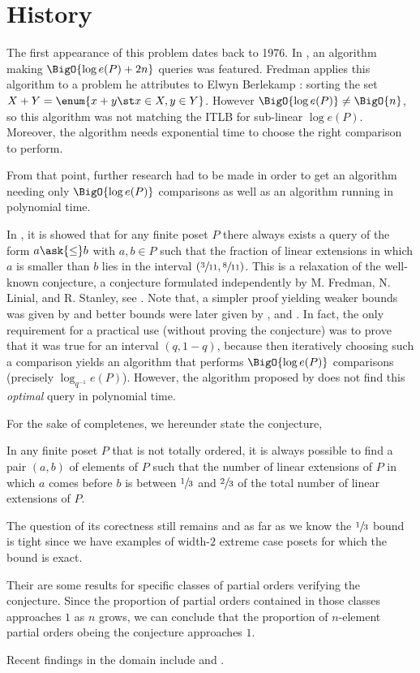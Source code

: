 \section{History}

The first appearance of this problem dates back to 1976. In
\citet*{fredman:1976}, an algorithm making $\BigO{\log e(P) + 2n}$ queries was
featured. Fredman applies this algorithm to a problem he attributes to Elwyn
Berlekamp : sorting the set $X + Y = \enum{x + y \st x \in X, y \in Y}$. However
$\BigO{\log e(P)} \neq \BigO{n}$, so this algorithm was not matching the ITLB
for sub-linear $\log e(P)$. Moreover, the algorithm needs exponential time to
choose the right comparison to perform.

From that point, further research had to be made in order to get an algorithm
needing only $\BigO{\log e(P)}$ comparisons as well as an algorithm running in
polynomial time.

In \citet*{kahn1984balancing}, it is showed that for any finite poset \(P\)
there always exists a query of the form \(a \ask{\leq} b\) with \(a,b \in P\)
such that the fraction of linear extensions in which $a$ is smaller than $b$
lies in the interval $(\sfrac{3}{11}, \sfrac{8}{11})$. This is a relaxation of
the well-known \onethirdtwothird conjecture, a conjecture formulated
independently by M. Fredman, N. Linial, and R. Stanley, see
\citet*{linial1984information}. Note that, a simpler proof yielding weaker
bounds was given by \citet*{kahn1991balancing} and better bounds were later
given by \citet*{brightwell1995balancing}, and \citet*{brightwell1999balanced}.
In fact, the only requirement for a practical use (without proving the
conjecture) was to prove that it was true for an interval $(q, 1-q)$, because
then iteratively choosing such a comparison yields an algorithm that performs
$\BigO{\log e(P)}$ comparisons (precisely $\log_{q^{-1}} e(P)$). However, the
algorithm proposed by \citet*{kahn1984balancing} does not find this
\emph{optimal} query in polynomial time.

For the sake of completenes, we hereunder state the \onethirdtwothird
conjecture,

\begin{conjecture}
In any finite poset $P$ that is not totally ordered, it is always possible to
find a pair $(a,b)$ of elements of $P$ such that the number of linear
extensions of $P$ in which $a$ comes before $b$ is between $\sfrac{1}{3}$ and
$\sfrac{2}{3}$ of the total number of linear extensions of $P$.
\end{conjecture}

The question of its corectness still remains and as far as we know the
$\sfrac{1}{3}$ bound is tight since we have examples of width-$2$ extreme case
posets for which the bound is exact.

Their are some results \cite{peczarski:2006} for specific classes of partial
orders verifying the conjecture. Since the proportion of partial orders
contained in those classes approaches $1$ as $n$ grows, we can conclude that
the proportion of $n$-element partial orders obeing the \onethirdtwothird
conjecture approaches $1$.

Recent findings in the domain include \citet*{zaguia:2011} and
\citet*{peczarski:2008}.
